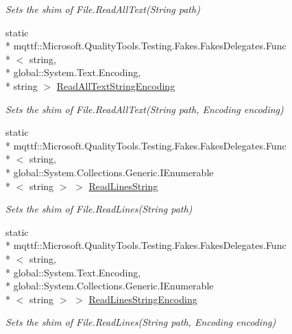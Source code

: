 \begin{DoxyCompactItemize}
\begin{DoxyCompactList}\small\item\em Sets the shim of File.\-Read\-All\-Text(\-String path)\end{DoxyCompactList}\item 
static \\*
mqttf\-::\-Microsoft.\-Quality\-Tools.\-Testing.\-Fakes.\-Fakes\-Delegates.\-Func\\*
$<$ string, \\*
global\-::\-System.\-Text.\-Encoding, \\*
string $>$ \hyperlink{class_system_1_1_i_o_1_1_fakes_1_1_shim_file_a5522b07e6aea4bb8155b06f53de8cb45}{Read\-All\-Text\-String\-Encoding}
\begin{DoxyCompactList}\small\item\em Sets the shim of File.\-Read\-All\-Text(\-String path, Encoding encoding)\end{DoxyCompactList}\item 
static \\*
mqttf\-::\-Microsoft.\-Quality\-Tools.\-Testing.\-Fakes.\-Fakes\-Delegates.\-Func\\*
$<$ string, \\*
global\-::\-System.\-Collections.\-Generic.\-I\-Enumerable\\*
$<$ string $>$ $>$ \hyperlink{class_system_1_1_i_o_1_1_fakes_1_1_shim_file_ac0ef654ecb8832fa871e7db459328c93}{Read\-Lines\-String}
\begin{DoxyCompactList}\small\item\em Sets the shim of File.\-Read\-Lines(\-String path)\end{DoxyCompactList}\item 
static \\*
mqttf\-::\-Microsoft.\-Quality\-Tools.\-Testing.\-Fakes.\-Fakes\-Delegates.\-Func\\*
$<$ string, \\*
global\-::\-System.\-Text.\-Encoding, \\*
global\-::\-System.\-Collections.\-Generic.\-I\-Enumerable\\*
$<$ string $>$ $>$ \hyperlink{class_system_1_1_i_o_1_1_fakes_1_1_shim_file_aa0403490a92b6ac76d5011281467bbcc}{Read\-Lines\-String\-Encoding}
\begin{DoxyCompactList}\small\item\em Sets the shim of File.\-Read\-Lines(\-String path, Encoding encoding)\end{DoxyCompactList}\item 

\end{DoxyCompactItemize}
